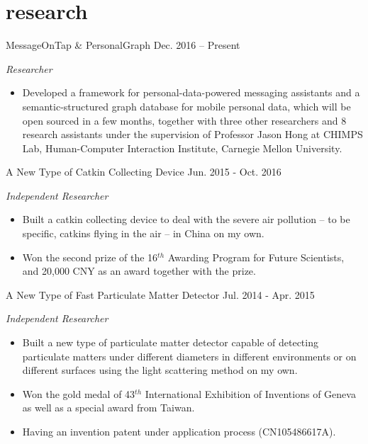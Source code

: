 \documentclass[]{adamyi-cv} %
\begin{document}
\section{research}

\begin{entrylist}


\entry
{MessageOnTap \& PersonalGraph}
{Dec. 2016 -- Present}
{\emph{Researcher}
\begin{itemize}
\item Developed a framework for personal-data-powered messaging assistants and a semantic-structured graph database for mobile personal data, which will be open sourced in a few months, together with three other researchers and 8 research assistants under the supervision of Professor Jason Hong at CHIMPS Lab, Human-Computer Interaction Institute, Carnegie Mellon University.
\end{itemize}}


\entry
{A New Type of Catkin Collecting Device}
{Jun. 2015 - Oct. 2016}
{\emph{Independent Researcher}
\begin{itemize}
\item Built a catkin collecting device to deal with the severe air pollution – to be specific, catkins flying in the air – in China on my own.
\item Won the second prize of the 16$^{th}$ Awarding Program for Future Scientists, and 20,000 CNY as an award together with the prize.
\end{itemize}}


\entry
{A New Type of Fast Particulate Matter Detector}
{Jul. 2014 - Apr. 2015}
{\emph{Independent Researcher}
\begin{itemize}
\item Built a new type of particulate matter detector capable of detecting particulate matters under different diameters in different environments or on different surfaces using the light scattering method on my own.
\item Won the gold medal of 43$^{th}$ International Exhibition of Inventions of Geneva as well as a special award from Taiwan.
\item Having an invention patent under application process (CN105486617A).
\end{itemize}}


\end{entrylist}
\end{document}
